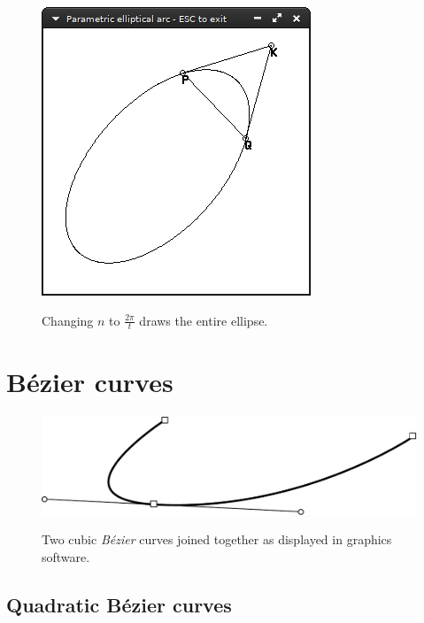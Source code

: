 \documentclass[12pt,openany,a4,usenames,dvipsnames]{book}
\DeclareRobustCommand{\Caption}[1]{\par%
  \vspace{1em}
  {\noindent{}#1}}
\begin{document}
\begin{figure}[H]
  \centering
  \includegraphics[keepaspectratio]{figures/parellarc2.png}
  \Caption{Changing $n$ to $\frac{2\pi{}}{t}$ draws the entire ellipse.}
\end{figure}
\chapter{Bézier curves}
\begin{figure}[H]
\centering
\includegraphics[width=\textwidth,keepaspectratio]{figures/bezier_path.pdf}\par
{\noindent{}Two cubic \emph{Bézier} curves joined together as displayed in graphics software.}
\end{figure}
\skelpar%
\skelpar%
\section{Quadratic Bézier curves}
\end{document}
